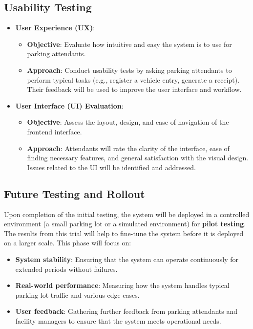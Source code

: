 \subsection{Usability Testing}

\begin{itemize}
    \item \textbf{User Experience (UX)}:
    \begin{itemize}
        \item \textbf{Objective}: Evaluate how intuitive and easy the system is to use for parking attendants.
        \item \textbf{Approach}: Conduct usability tests by asking parking attendants to perform typical tasks (e.g., register a vehicle entry, generate a receipt). Their feedback will be used to improve the user interface and workflow.
    \end{itemize}

    \item \textbf{User Interface (UI) Evaluation}:
    \begin{itemize}
        \item \textbf{Objective}: Assess the layout, design, and ease of navigation of the frontend interface.
        \item \textbf{Approach}: Attendants will rate the clarity of the interface, ease of finding necessary features, and general satisfaction with the visual design. Issues related to the UI will be identified and addressed.
    \end{itemize}
\end{itemize}

\subsection{Future Testing and Rollout}

Upon completion of the initial testing, the system will be deployed in a controlled environment (a small parking lot or a simulated environment) for \textbf{pilot testing}. The results from this trial will help to fine-tune the system before it is deployed on a larger scale. This phase will focus on:

\begin{itemize}
    \item \textbf{System stability}: Ensuring that the system can operate continuously for extended periods without failures.
    \item \textbf{Real-world performance}: Measuring how the system handles typical parking lot traffic and various edge cases.
    \item \textbf{User feedback}: Gathering further feedback from parking attendants and facility managers to ensure that the system meets operational needs.
\end{itemize}

